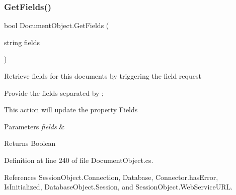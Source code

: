 \subsubsection{\texorpdfstring{Get\+Fields()}{GetFields()}\hspace{0.1cm}{\footnotesize\ttfamily [1/2]}}
{\footnotesize\ttfamily bool Document\+Object.\+Get\+Fields (\begin{DoxyParamCaption}\item[{string}]{fields }\end{DoxyParamCaption})}



Retrieve fields for this documents by triggering the field request 

Provide the fields separated by ;

This action will update the property \textquotesingle{}Fields\textquotesingle{}


\begin{DoxyParams}{Parameters}
{\em fields} & \\
\hline
\end{DoxyParams}
\begin{DoxyReturn}{Returns}
Boolean
\end{DoxyReturn}


Definition at line 240 of file Document\+Object.\+cs.



References Session\+Object.\+Connection, Database, Connector.\+has\+Error, Is\+Initialized, Database\+Object.\+Session, and Session\+Object.\+Web\+Service\+U\+RL.


